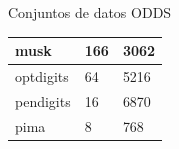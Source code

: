 \documentclass[10pt]{beamer}
\begin{document}
\begin{frame}[fragile]{Conjuntos de datos ODDS}
\begin{table}[H]
\begin{tabular}{|l|l|l|}
		musk                                        & 166                                                 & 3062                                                     \\ \hline
		optdigits                                   & 64                                                  & 5216                                                     \\ \hline
		pendigits                                   & 16                                                  & 6870                                                     \\ \hline
		pima                                        & 8                                                   & 768                                                      \\ \hline
	\end{tabular}
\end{table}

\end{frame}
\end{document}
